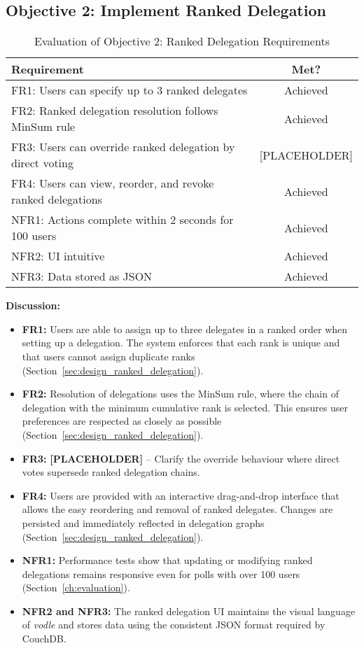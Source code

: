 \subsection{Objective 2: Implement Ranked Delegation}

\begin{table}[H]
\centering
\begin{tabular}{|p{9cm}|c|}
\hline
\textbf{Requirement} & \textbf{Met?} \\ \hline
FR1: Users can specify up to 3 ranked delegates & Achieved \\ \hline
FR2: Ranked delegation resolution follows MinSum rule & Achieved \\ \hline
FR3: Users can override ranked delegation by direct voting & [PLACEHOLDER] \\ \hline
FR4: Users can view, reorder, and revoke ranked delegations & Achieved \\ \hline
NFR1: Actions complete within 2 seconds for 100 users & Achieved \\ \hline
NFR2: UI intuitive & Achieved \\ \hline
NFR3: Data stored as JSON & Achieved \\ \hline
\end{tabular}
\caption{Evaluation of Objective 2: Ranked Delegation Requirements}
\label{tab:objective2_requirements}
\end{table}

\textbf{Discussion:}

\begin{itemize}
    \item \textbf{FR1:} Users are able to assign up to three delegates in a ranked order when setting up a delegation. The system enforces that each rank is unique and that users cannot assign duplicate ranks (Section~\ref{sec:design_ranked_delegation}).
    \item \textbf{FR2:} Resolution of delegations uses the MinSum rule, where the chain of delegation with the minimum cumulative rank is selected. This ensures user preferences are respected as closely as possible (Section~\ref{sec:design_ranked_delegation}).
    \item \textbf{FR3:} \textbf{[PLACEHOLDER]} -- Clarify the override behaviour where direct votes supersede ranked delegation chains.
    \item \textbf{FR4:} Users are provided with an interactive drag-and-drop interface that allows the easy reordering and removal of ranked delegates. Changes are persisted and immediately reflected in delegation graphs (Section~\ref{sec:design_ranked_delegation}).
    \item \textbf{NFR1:} Performance tests show that updating or modifying ranked delegations remains responsive even for polls with over 100 users (Section~\ref{ch:evaluation}).
    \item \textbf{NFR2 and NFR3:} The ranked delegation UI maintains the visual language of \textit{vodle} and stores data using the consistent JSON format required by CouchDB.
\end{itemize}

